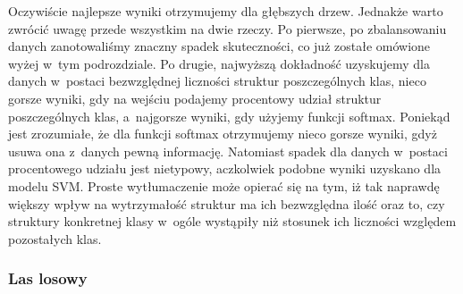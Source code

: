 Oczywiście najlepsze wyniki otrzymujemy dla głębszych drzew. Jednakże warto zwrócić uwagę przede wszystkim na dwie rzeczy. Po pierwsze, po zbalansowaniu danych zanotowaliśmy znaczny spadek skuteczności, co już zostałe omówione wyżej w~tym podrozdziale. Po drugie, najwyższą dokładność uzyskujemy dla danych w~postaci bezwzględnej liczności struktur poszczególnych klas, nieco gorsze wyniki, gdy na wejściu podajemy procentowy udział struktur poszczególnych klas, a~najgorsze wyniki, gdy użyjemy funkcji softmax. Poniekąd jest zrozumiałe, że dla funkcji softmax otrzymujemy nieco gorsze wyniki, gdyż usuwa ona z~danych pewną informację. Natomiast spadek dla danych w~postaci procentowego udziału jest nietypowy, aczkolwiek podobne wyniki uzyskano dla modelu SVM. Proste wytłumaczenie może opierać się na tym, iż tak naprawdę większy wpływ na wytrzymałość struktur ma ich bezwzględna ilość oraz to, czy struktury konkretnej klasy w~ogóle wystąpiły niż stosunek ich liczności względem pozostałych klas.

\subsubsection{Las losowy}
\label{structures.with.rfc}

